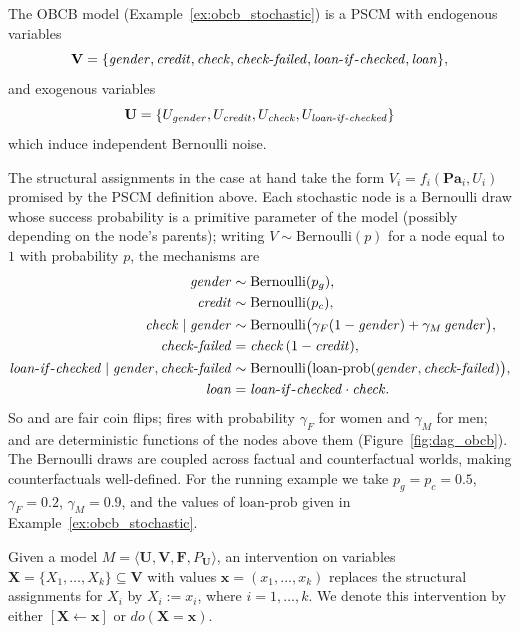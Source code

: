 The OBCB model (Example~\ref{ex:obcb_stochastic}) is a PSCM with endogenous
variables
\[
\mathbf{V}=\{\varname{gender},\varname{credit},\varname{check},\varname{check\text{-}failed},\varname{loan\text{-}if\text{-}checked},\varname{loan}\},
\]
and exogenous variables
\[
\mathbf{U}=\{U_{\varname{gender}},U_{\varname{credit}},U_{\varname{check}},U_{\varname{loan\text{-}if\text{-}checked}}\}
\]
which induce independent Bernoulli noise.

The structural assignments in the case at hand take the form $V_i = f_i(\mathbf{Pa}_i, U_i)$
promised by the PSCM definition above. Each stochastic node is a Bernoulli draw whose
success probability is a primitive parameter of the model (possibly depending on the
node's parents); writing $V \sim \mathrm{Bernoulli}(p)$ for a node equal to $1$ with
probability $p$, the mechanisms are
\begin{align*}
\varname{gender}        &\sim \mathrm{Bernoulli}(p_g), \\
\varname{credit}        &\sim \mathrm{Bernoulli}(p_c), \\
\varname{check} \mid \varname{gender}        &\sim \mathrm{Bernoulli}\bigl(\gamma_F(1-\varname{gender}) + \gamma_M\,\varname{gender}\bigr), \\
\varname{check\text{-}failed}  &= \varname{check}\,(1-\varname{credit}), \\
\varname{loan\text{-}if\text{-}checked} \mid \varname{gender}, \varname{check\text{-}failed} &\sim \mathrm{Bernoulli}\bigl(\mathrm{loan\text{-}prob}(\varname{gender}, \varname{check\text{-}failed})\bigr), \\
\varname{loan}          &= \varname{loan\text{-}if\text{-}checked} \cdot \varname{check}.
\end{align*}
So  and  are fair coin flips;  fires with
probability $\gamma_F$ for women and $\gamma_M$ for men;  and
 are deterministic functions of the nodes above them
(Figure~\ref{fig:dag_obcb}). The Bernoulli draws are coupled across factual and counterfactual worlds, making counterfactuals well-defined. For the running example we take $p_g = p_c = 0.5$,
$\gamma_F = 0.2$, $\gamma_M = 0.9$, and the values of $\mathrm{loan\text{-}prob}$
given in Example~\ref{ex:obcb_stochastic}.

\begin{definition}[Interventions]
Given a model \(M = \langle \mathbf{U}, \mathbf{V}, \mathbf{F}, P_{\mathbf{U}} \rangle\),
an intervention on variables \(\mathbf{X} = \{X_1, \dots, X_k\} \subseteq \mathbf{V}\)
with values \(\mathbf{x} = (x_1, \dots, x_k)\) replaces the structural assignments for \(X_i\) by $X_i := x_i$, where $i = 1, \dots, k$.
We denote this intervention by either \([\mathbf{X} \leftarrow \mathbf{x}]\) or $do(\mathbf{X} = \mathbf{x})$.
\end{definition}

